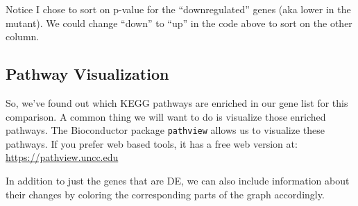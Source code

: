 \documentclass[
]{book}
\newenvironment{Shaded}{\begin{snugshade}}{\end{snugshade}}
\newcommand{\AttributeTok}[1]{\textcolor[rgb]{0.13,0.29,0.53}{#1}}
\newcommand{\CommentTok}[1]{\textcolor[rgb]{0.56,0.35,0.01}{\textit{#1}}}
\newcommand{\ConstantTok}[1]{\textcolor[rgb]{0.56,0.35,0.01}{#1}}
\newcommand{\ControlFlowTok}[1]{\textcolor[rgb]{0.13,0.29,0.53}{\textbf{#1}}}
\newcommand{\FunctionTok}[1]{\textcolor[rgb]{0.13,0.29,0.53}{\textbf{#1}}}
\newcommand{\NormalTok}[1]{#1}
\newcommand{\OtherTok}[1]{\textcolor[rgb]{0.56,0.35,0.01}{#1}}
\newcommand{\SpecialCharTok}[1]{\textcolor[rgb]{0.81,0.36,0.00}{\textbf{#1}}}
\newcommand{\StringTok}[1]{\textcolor[rgb]{0.31,0.60,0.02}{#1}}
\begin{document}
Notice I chose to sort on p-value for the ``downregulated'' genes (aka lower in the mutant). We could change ``down'' to ``up'' in the code above to sort on the other column.

\hypertarget{pathway-visualization}{%
\subsection{Pathway Visualization}\label{pathway-visualization}}

So, we've found out which KEGG pathways are enriched in our gene list for this comparison. A common thing we will want to do is visualize those enriched pathways. The Bioconductor package \texttt{pathview} allows us to visualize these pathways. If you prefer web based tools, it has a free web version at: \url{https://pathview.uncc.edu}

In addition to just the genes that are DE, we can also include information about their changes by coloring the corresponding parts of the graph accordingly.

\begin{Shaded}
\end{Shaded}
\end{document}
